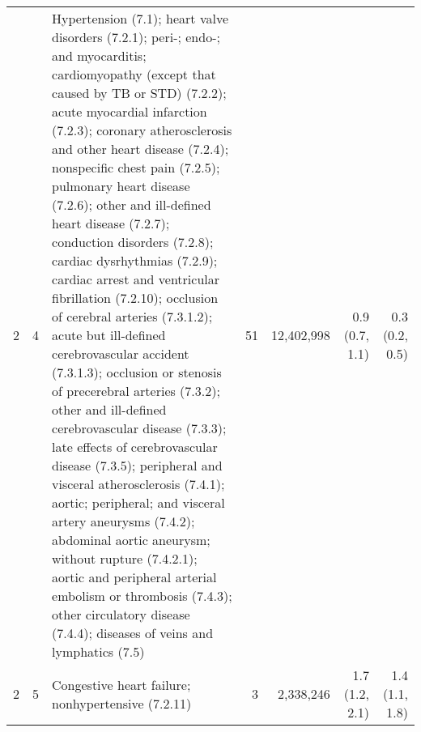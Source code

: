 \begin{tabular}{llp{6.5cm}rrrr}
   2 &  4 & Hypertension (7.1); heart valve disorders (7.2.1); peri-; endo-; and myocarditis; cardiomyopathy (except that caused by TB or STD) (7.2.2); acute myocardial infarction (7.2.3); coronary atherosclerosis and other heart disease (7.2.4); nonspecific chest pain (7.2.5); pulmonary heart disease (7.2.6); other and ill-defined heart disease (7.2.7); conduction disorders (7.2.8); cardiac dysrhythmias (7.2.9); cardiac arrest and ventricular fibrillation (7.2.10); occlusion of cerebral arteries (7.3.1.2); acute but ill-defined cerebrovascular accident (7.3.1.3); occlusion or stenosis of precerebral arteries (7.3.2); other and ill-defined cerebrovascular disease (7.3.3); late effects of cerebrovascular disease (7.3.5); peripheral and visceral atherosclerosis (7.4.1); aortic; peripheral; and visceral artery aneurysms (7.4.2); abdominal aortic aneurysm; without rupture (7.4.2.1); aortic and peripheral arterial embolism or thrombosis (7.4.3); other circulatory disease (7.4.4); diseases of veins and lymphatics (7.5) & 51 & 12,402,998 & 0.9 (0.7, 1.1) & 0.3 (0.2, 0.5) \\ 
   2 &  5 & Congestive heart failure; nonhypertensive (7.2.11) &  3 & 2,338,246 & 1.7 (1.2, 2.1) & 1.4 (1.1, 1.8) \\ 
   \hline
\end{tabular}

